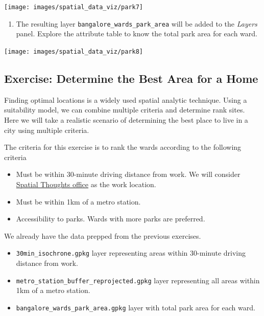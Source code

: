 \documentclass[
  12pt,
  a4paper]{article}
\providecommand{\tightlist}{%
  \setlength{\itemsep}{0pt}\setlength{\parskip}{0pt}}
\begin{document}
\begin{center}\texttt{[image: images/spatial\_data\_viz/park7]} \end{center}

\begin{enumerate}
\def\labelenumi{\arabic{enumi}.}
\setcounter{enumi}{7}
\tightlist
\item
  The resulting layer \texttt{bangalore\_wards\_park\_area} will be
  added to the \emph{Layers} panel. Explore the attribute table to know
  the total park area for each ward.
\end{enumerate}

\begin{center}\texttt{[image: images/spatial\_data\_viz/park8]} \end{center}

\newpage

\hypertarget{exercise-determine-the-best-area-for-a-home}{%
\subsection{Exercise: Determine the Best Area for a
Home}\label{exercise-determine-the-best-area-for-a-home}}

Finding optimal locations is a widely used spatial analytic technique.
Using a suitability model, we can combine multiple criteria and
determine rank sites. Here we will take a realistic scenario of
determining the best place to live in a city using multiple criteria.

The criteria for this exercise is to rank the wards according to the
following criteria

\begin{itemize}
\tightlist
\item
  Must be within 30-minute driving distance from work. We will consider
  \href{https://g.page/spatialthoughts?share}{Spatial Thoughts office}
  as the work location.
\item
  Must be within 1km of a metro station.
\item
  Accessibility to parks. Wards with more parks are preferred.
\end{itemize}

We already have the data prepped from the previous exercises.

\begin{itemize}
\tightlist
\item
  \texttt{30min\_isochrone.gpkg} layer representing areas within
  30-minute driving distance from work.
\item
  \texttt{metro\_station\_buffer\_reprojected.gpkg} layer representing
  all areas within 1km of a metro station.
\item
  \texttt{bangalore\_wards\_park\_area.gpkg} layer with total park area
  for each ward.
\end{itemize}
\end{document}
